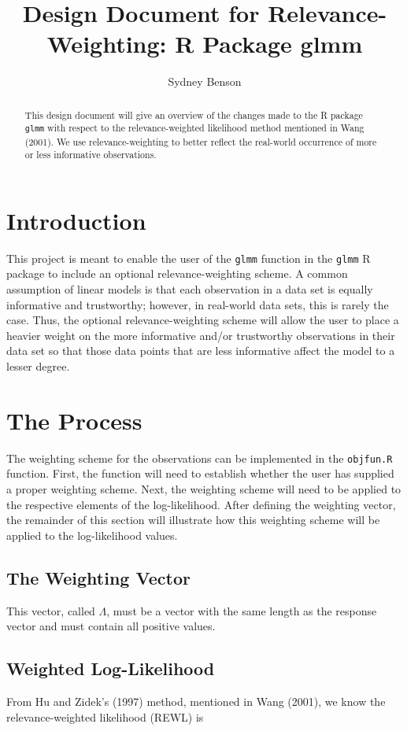 \documentclass{article}
\title{Design Document for Relevance-Weighting: R Package glmm}
\author{Sydney Benson}
\begin{document}
\maketitle{}

\begin{abstract}
This design document will give an overview of the changes made to the R package \texttt{glmm} with respect to the relevance-weighted likelihood method mentioned in Wang (2001). We use relevance-weighting to better reflect the real-world occurrence of more or less informative observations.
\end{abstract}

\section{Introduction}
This project is meant to enable the user of the \texttt{glmm} function in the \texttt{glmm} R package to include an optional relevance-weighting scheme. A common assumption of linear models is that each observation in a data set is equally informative and trustworthy; however, in real-world data sets, this is rarely the case. Thus, the optional relevance-weighting scheme will allow the user to place a heavier weight on the more informative and/or trustworthy observations in their data set so that those data points that are less informative affect the model to a lesser degree.

\section{The Process}
The weighting scheme for the observations can be implemented in the \texttt{objfun.R} function. First, the function will need to establish whether the user has supplied a proper weighting scheme. Next, the weighting scheme will need to be applied to the respective elements of the log-likelihood. After defining the weighting vector, the remainder of this section will illustrate how this weighting scheme will be applied to the log-likelihood values. 

\subsection{The Weighting Vector}
This vector, called $\Lambda$, must be a vector with the same length as the response vector and must contain all positive values. 

\subsection{Weighted Log-Likelihood}
From Hu and Zidek's (1997) method, mentioned in Wang (2001), we know the relevance-weighted likelihood (REWL) is
\end{document}
